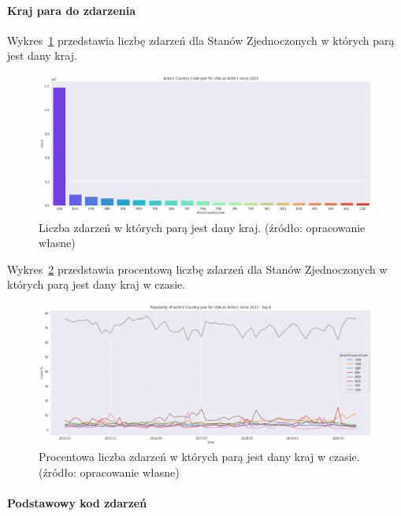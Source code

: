 \documentclass[11pt]{report}
\begin{document}
    \paragraph{Kraj para do zdarzenia}

    Wykres~\ref{fig:USApair} przedstawia liczbę zdarzeń dla Stanów Zjednoczonych w których parą jest dany kraj.

    \begin{figure}[!htp]
        \centering
        \includegraphics[width=1 \textwidth]{fig/USA/USAactor2Pair.png}
        \caption{Liczba zdarzeń w których parą jest dany kraj. (źródło: opracowanie własne)}
        \label{fig:USApair}
    \end{figure}


    Wykres~\ref{fig:USApairPerc} przedstawia procentową liczbę zdarzeń dla Stanów Zjednoczonych w których parą jest dany kraj w czasie.
    \begin{figure}[!htp]
        \centering
        \includegraphics[width=1 \textwidth]{fig/USA/USAactor2PairPercinTIME.png}
        \caption{Procentowa liczba zdarzeń w których parą jest dany kraj w czasie. (źródło: opracowanie własne)}
        \label{fig:USApairPerc}
    \end{figure}

    \paragraph{Podstawowy kod zdarzeń}
\end{document}
